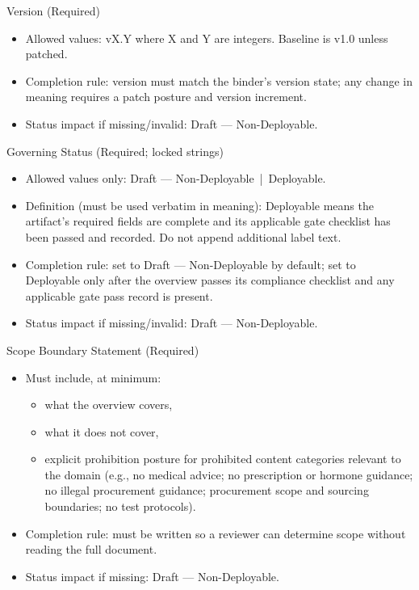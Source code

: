 \documentclass[10pt]{article}
\begin{document}
Version (Required)

\begin{itemize}
\item Allowed values: vX.Y where X and Y are integers. Baseline is v1.0 unless patched.
\item Completion rule: version must match the binder’s version state; any change in meaning requires a patch posture and version increment.
\item Status impact if missing/invalid: Draft — Non-Deployable.
\end{itemize}

Governing Status (Required; locked strings)

\begin{itemize}
\item Allowed values only: Draft — Non-Deployable \,|\, Deployable.
\item Definition (must be used verbatim in meaning): Deployable means the artifact’s required fields are complete and its applicable gate checklist has been passed and recorded. Do not append additional label text.
\item Completion rule: set to Draft — Non-Deployable by default; set to Deployable only after the overview passes its compliance checklist and any applicable gate pass record is present.
\item Status impact if missing/invalid: Draft — Non-Deployable.
\end{itemize}

Scope Boundary Statement (Required)

\begin{itemize}
\item Must include, at minimum:
  \begin{itemize}
  \item what the overview covers,
  \item what it does not cover,
  \item explicit prohibition posture for prohibited content categories relevant to the domain (e.g., no medical advice; no prescription or hormone guidance; no illegal procurement guidance; procurement scope and sourcing boundaries; no test protocols).
  \end{itemize}
\item Completion rule: must be written so a reviewer can determine scope without reading the full document.
\item Status impact if missing: Draft — Non-Deployable.
\end{itemize}
\end{document}
